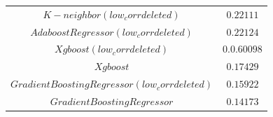 \documentclass{tikzposter} %
\begin{document}
\begin{columns}
{\begin{center}
\begin{tabular}{c c }
				$K-neighbor(low_corr deleted)$ &  {$0.22111$}   \\
				$Adaboost Regressor(low_corr deleted)$ &  {$0.22124$}    \\
				$Xgboost(low_corr deleted)$ &  {$0.0.60098$}    \\
				$Xgboost$ &  {$0.17429$}    \\
				$Gradient Boosting Regressor(low_corr deleted)$ &  {$0.15922$}    \\
				$Gradient Boosting Regressor$ &  {$0.14173$}     \\
				\bottomrule
			\end{tabular}
		\end{center}
	}
	\end{columns}
\end{document}
